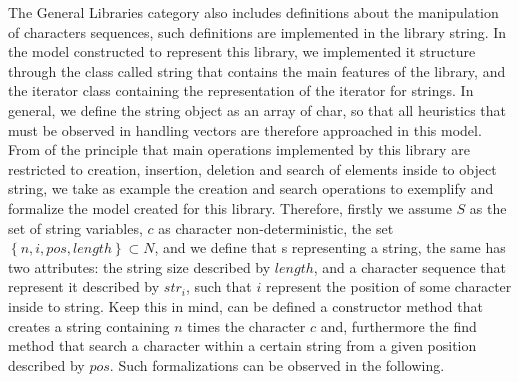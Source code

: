 \documentclass[a4paper]{llncs}
\begin{document}
The General Libraries category also includes definitions about the manipulation of characters sequences, such definitions are implemented in 
the library string. In the model constructed to represent this library, we implemented it structure through the class called string that contains 
the main features of the library, and the iterator class containing the representation of the iterator for strings. In general, we define the 
string object as an array of char, so that all heuristics that must be observed in handling vectors are therefore approached in this model. 
From of the principle that main operations implemented by this library are restricted to creation, insertion, deletion and search of elements 
inside to object string, we take as example the creation and search operations to exemplify and formalize the model created for this library. 
Therefore, firstly we assume $S$ as the set of string variables, $c$ as character non-deterministic, the set $\left\{n, i, pos, length\right\} \subset N$, 
and we define that s representing a string, the same has two attributes: the string size described by $length$, and a character sequence that 
represent it described by $str_{i}$, such that $i$ represent the position of some character inside to string. Keep this in mind, can be defined a 
constructor method that creates a string containing $n$ times the character $c$ and, furthermore the find method that search a character within a 
certain string from a given position described by $pos$. Such formalizations can be observed in the following.
\end{document}
